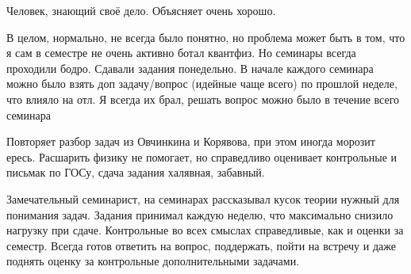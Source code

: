                 \begin{commentbox} 
                    Человек, знающий своё дело. Объясняет очень хорошо.  
                \end{commentbox} 
            
                \begin{commentbox} 
                    В целом, нормально, не всегда было понятно, но проблема может быть в том, что я сам в семестре не очень активно ботал квантфиз. Но семинары всегда проходили бодро. Сдавали задания понедельно. В начале каждого семинара можно было взять доп задачу/вопрос (идейные чаще всего) по прошлой неделе, что влияло на отл. Я всегда их брал, решать вопрос можно было в течение всего семинара 
                \end{commentbox} 
            
                \begin{commentbox} 
                    Повторяет разбор задач из Овчинкина и Корявова, при этом иногда морозит ересь. Расшарить физику не помогает, но справедливо оценивает контрольные и письмак по ГОСу, сдача задания халявная, забавный. 
                \end{commentbox} 
            
                \begin{commentbox} 
                    Замечательный семинарист, на семинарах рассказывал кусок теории нужный для понимания задач. Задания принимал каждую неделю, что максимально снизило нагрузку при сдаче. Контрольные во всех смыслах справедливые, как и оценки за семестр. Всегда готов ответить на вопрос, поддержать, пойти на встречу и даже поднять оценку за контрольные дополнительными задачами.  
                \end{commentbox} 
        

